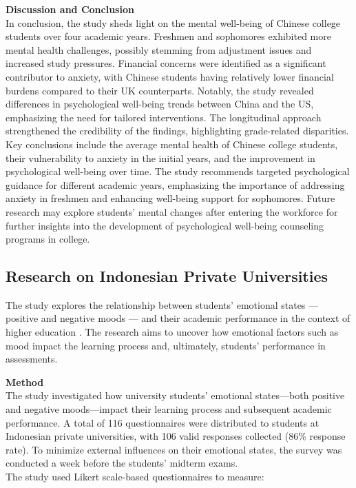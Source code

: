 \vspace{5mm}

\noindent \textbf{Discussion and Conclusion} \\
In conclusion, the study sheds light on the mental well-being of Chinese college students over four academic years. Freshmen and sophomores exhibited more mental health challenges, possibly stemming from adjustment issues and increased study pressures. Financial concerns were identified as a significant contributor to anxiety, with Chinese students having relatively lower financial burdens compared to their UK counterparts. Notably, the study revealed differences in psychological well-being trends between China and the US, emphasizing the need for tailored interventions. The longitudinal approach strengthened the credibility of the findings, highlighting grade-related disparities. Key conclusions include the average mental health of Chinese college students, their vulnerability to anxiety in the initial years, and the improvement in psychological well-being over time. The study recommends targeted psychological guidance for different academic years, emphasizing the importance of addressing anxiety in freshmen and enhancing well-being support for sophomores. Future research may explore students' mental changes after entering the workforce for further insights into the development of psychological well-being counseling programs in college.

\subsection{Research on Indonesian Private Universities}

The study explores the relationship between students' emotional states — positive and negative moods — and their academic performance in the context of higher education \cite{research-3}. The research aims to uncover how emotional factors such as mood impact the learning process and, ultimately, students' performance in assessments.

\vspace{5mm}

\noindent \textbf{Method} \\
The study investigated how university students' emotional states—both positive and negative moods—impact their learning process and subsequent academic performance. A total of 116 questionnaires were distributed to students at Indonesian private universities, with 106 valid responses collected (86\% response rate). To minimize external influences on their emotional states, the survey was conducted a week before the students' midterm exams.\\
The study used Likert scale-based questionnaires to measure:

